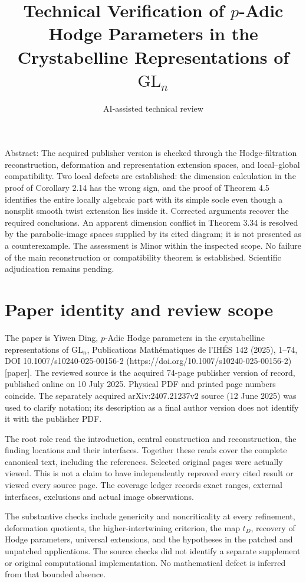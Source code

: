 \documentclass[10pt]{article}
\title{Technical Verification of
\(p\)-Adic Hodge Parameters in the
Crystabelline Representations of \(\mathrm{GL}_n\)}
\author{AI-assisted technical review}
\date{}
\begin{document}
\maketitle
Abstract: The acquired publisher version is checked through the Hodge-filtration reconstruction, deformation and representation extension spaces, and local–global compatibility. Two local defects are established: the dimension calculation in the proof of Corollary 2.14 has the wrong sign, and the proof of Theorem 4.5 identifies the entire locally algebraic part with its simple socle even though a nonsplit smooth twist extension lies inside it. Corrected arguments recover the required conclusions. An apparent dimension conflict in Theorem 3.34 is resolved by the parabolic-image spaces supplied by its cited diagram; it is not presented as a counterexample. The assessment is Minor within the inspected scope. No failure of the main reconstruction or compatibility theorem is established. Scientific adjudication remains pending.\par
\section*{Paper identity and review scope}
The paper is Yiwen Ding, \(p\)-Adic Hodge parameters in the crystabelline representations of \(\mathrm{GL}_n\), Publications Mathématiques de l’IHÉS 142 (2025), 1–74, DOI 10.1007/s10240-025-00156-2 (https://doi.org/10.1007/s10240-025-00156-2) [paper]. The reviewed source is the acquired 74-page publisher version of record, published online on 10 July 2025. Physical PDF and printed page numbers coincide. The separately acquired arXiv:2407.21237v2 source (12 June 2025) was used to clarify notation; its description as a final author version does not identify it with the publisher PDF.\par
The root role read the introduction, central construction and reconstruction, the finding locations and their interfaces. Together these reads cover the complete canonical text, including the references. Selected original pages were actually viewed. This is not a claim to have independently reproved every cited result or viewed every source page. The coverage ledger records exact ranges, external interfaces, exclusions and actual image observations.\par
The substantive checks include genericity and noncriticality at every refinement, deformation quotients, the higher-intertwining criterion, the map \(t_D\), recovery of Hodge parameters, universal extensions, and the hypotheses in the patched and unpatched applications. The source checks did not identify a separate supplement or original computational implementation. No mathematical defect is inferred from that bounded absence.\par
\end{document}
